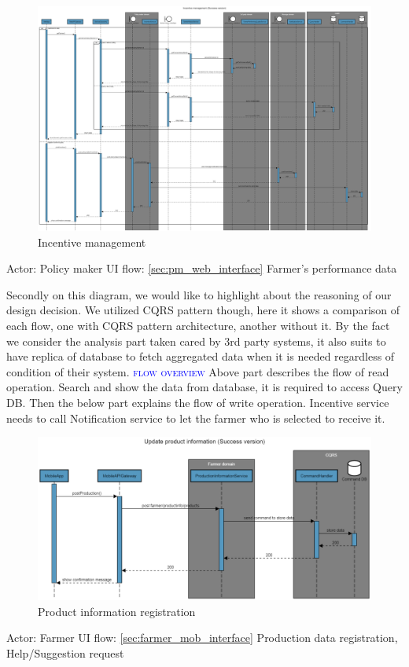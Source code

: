 \newpage
\begin{figure}[H]
	\centering
    \includegraphics[width=\textwidth]{Images/sequence-diagram/incentive-management.png}
	\caption{\label{fig:se_incentive}Incentive management}
\end{figure}
Actor: Policy maker
\newline
UI flow: {\ref{sec:pm_web_interface} Farmer's performance data}

Secondly on this diagram, we would like to highlight about the reasoning of our design decision. We utilized CQRS pattern though, here it shows a comparison of each flow, one with CQRS pattern architecture, another without it.
By the fact we consider the analysis part taken cared by 3rd party systems, it also suits to have replica of database to fetch aggregated data when it is needed regardless of condition of their system.
\newline
\textsc{\textcolor{blue}{flow overview}}
\newline
Above part describes the flow of read operation. Search and show the data from database, it is required to access Query DB.
Then the below part explains the flow of write operation.
Incentive service needs to call Notification service to let the farmer who is selected to receive it.

\newpage
\begin{figure}[H]
	\centering
    \includegraphics[width=\textwidth]{Images/sequence-diagram/product-info.png}
	\caption{\label{fig:se_product}Product information registration}
\end{figure}
Actor: Farmer
\newline
UI flow: {\ref{sec:farmer_mob_interface} Production data registration, Help/Suggestion request}

